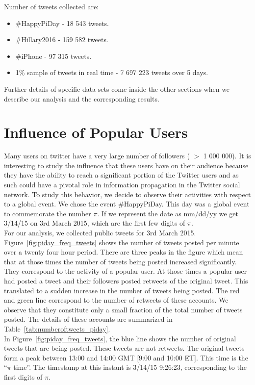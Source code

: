 \documentclass[journal, a4paper, 12pt]{article}
\begin{document}
Number of tweets collected are:
\begin{itemize}
\item \#HappyPiDay - 18 543 tweets.
\item \#Hillary2016 - 159 582 tweets.
\item \#iPhone - 97 315 tweets.
\item 1\% sample of tweets in real time - 7 697 223 tweets over 5 days.
\end{itemize}

Further details of specific data sets come inside the other sections when we describe our analysis and the corresponding results.


\section{Influence of Popular Users}

Many users on twitter have a very large number of followers ( $>$ 1 000 000). It is interesting to study the influence that these users have on their audience because they have the ability to reach a significant portion of the Twitter users and as such could have a pivotal role in information propagation in the Twitter social network. To study this behavior, we decide to observe their activities with respect to a global event. We chose the event \#HappyPiDay. This day was a global event to commemorate the number  $\pi$. If we represent the date as mm/dd/yy we get 3/14/15 on 3rd March 2015, which are the first few digits of $\pi$.
\\

For our analysis, we collected public tweets for 3rd March 2015. Figure~\ref{fig:piday_freq_tweets} shows the number of tweets posted per minute over a twenty four hour period. There are three peaks in the figure which mean that at those times the number of tweets being posted increased significantly.
They correspond to the activity of a popular user. At those times a popular user had posted a tweet and their followers posted retweets of the original tweet. This translated to a sudden increase in the number of tweets being posted. The red and green line correspond to the number of retweets of these accounts. We observe that they constitute only a small fraction of the total number of tweets posted. The details of these accounts are summarized in Table~\ref{tab:numberoftweets_piday}. 
\\

In Figure~\ref{fig:piday_freq_tweets}, the blue line shows the number of original tweets that are being posted. These tweets are not retweets. The original tweets form a peak between 13:00 and 14:00 GMT [9:00 and 10:00 ET]. This time is the ``$\pi$ time''. The timestamp at this instant is 3/14/15 9:26:23, corresponding to the first digits of $\pi$.
\\
\end{document}

